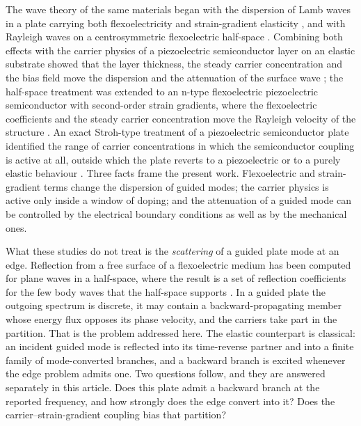 The wave theory of the same materials began with the dispersion of Lamb waves in
a plate carrying both flexoelectricity and strain-gradient elasticity
\cite{yang2018lamb}, and with Rayleigh waves on a centrosymmetric flexoelectric
half-space \cite{yang2020rayleigh}.  Combining both effects with the carrier
physics of a piezoelectric semiconductor layer on an elastic substrate showed
that the layer thickness, the steady carrier concentration and the bias field
move the dispersion and the attenuation of the surface wave
\cite{wang2025rayleigh}; the half-space treatment was extended to an n-type
flexoelectric piezoelectric semiconductor with second-order strain gradients,
where the flexoelectric coefficients and the steady carrier concentration move
the Rayleigh velocity of the structure \cite{biswas2025rayleigh}.  An exact
Stroh-type treatment of a piezoelectric semiconductor plate identified the range
of carrier concentrations in which the semiconductor coupling is active at all,
outside which the plate reverts to a piezoelectric or to a purely elastic
behaviour \cite{zhang2025pscplate}.  Three facts frame the present work.
Flexoelectric and strain-gradient terms change the dispersion of guided modes;
the carrier physics is active only inside a window of doping; and the
attenuation of a guided mode can be controlled by the electrical boundary
conditions as well as by the mechanical ones.

What these studies do not treat is the \emph{scattering} of a guided plate mode
at an edge.  Reflection from a free surface of a flexoelectric medium has been
computed for plane waves in a half-space, where the result is a set of
reflection coefficients for the few body waves that the half-space supports
\cite{mondal2022scattering}.  In a guided plate the outgoing spectrum is discrete, it may contain a
backward-propagating member whose energy flux opposes its phase velocity, and
the carriers take part in the partition.  That is the problem addressed here.  The elastic counterpart is classical: an incident
guided mode is reflected into its time-reverse partner and into a finite family
of mode-converted branches, and a backward branch is excited whenever the edge
problem admits one.  Two questions follow, and they are answered separately in
this article.  Does this plate admit a backward branch at the reported
frequency, and how strongly does the edge convert into it?  Does the
carrier--strain-gradient coupling bias that partition?

